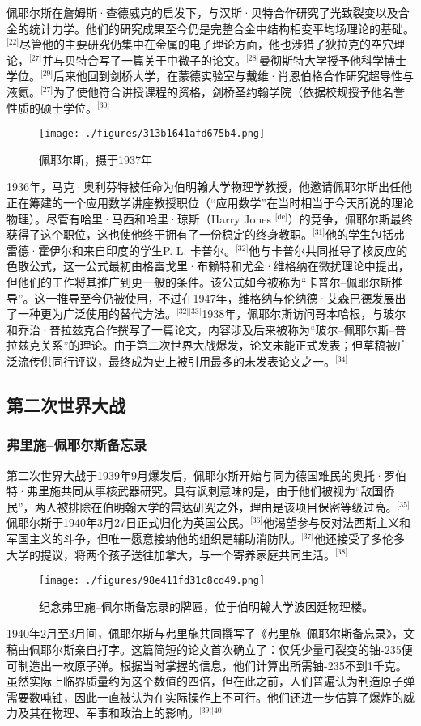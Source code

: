 佩耶尔斯在詹姆斯·查德威克的启发下，与汉斯·贝特合作研究了光致裂变以及合金的统计力学。他们的研究成果至今仍是完整合金中结构相变平均场理论的基础。\(^\text{[22]}\)尽管他的主要研究仍集中在金属的电子理论方面，他也涉猎了狄拉克的空穴理论，\(^\text{[27]}\)并与贝特合写了一篇关于中微子的论文。\(^\text{[28]}\)曼彻斯特大学授予他科学博士学位。\(^\text{[29]}\)后来他回到剑桥大学，在蒙德实验室与戴维·肖恩伯格合作研究超导性与液氦。\(^\text{[27]}\)为了使他符合讲授课程的资格，剑桥圣约翰学院（依据校规授予他名誉性质的硕士学位。\(^\text{[30]}\)
\begin{figure}[ht]
\centering
\texttt{[image: ./figures/313b1641afd675b4.png]}
\caption{佩耶尔斯，摄于1937年} \label{fig_LDF_3}
\end{figure}
1936年，马克·奥利芬特被任命为伯明翰大学物理学教授，他邀请佩耶尔斯出任他正在筹建的一个应用数学讲座教授职位（“应用数学”在当时相当于今天所说的理论物理）。尽管有哈里·马西和哈里·琼斯（Harry Jones \(^\text{[de]}\)）的竞争，佩耶尔斯最终获得了这个职位，这也使他终于拥有了一份稳定的终身教职。\(^\text{[31]}\)他的学生包括弗雷德·霍伊尔和来自印度的学生P. L. 卡普尔。\(^\text{[32]}\)他与卡普尔共同推导了核反应的色散公式，这一公式最初由格雷戈里·布赖特和尤金·维格纳在微扰理论中提出，但他们的工作将其推广到更一般的条件。该公式如今被称为“卡普尔–佩耶尔斯推导”。这一推导至今仍被使用，不过在1947年，维格纳与伦纳德·艾森巴德发展出了一种更为广泛使用的替代方法。\(^\text{[32][33]}\)1938年，佩耶尔斯访问哥本哈根，与玻尔和乔治·普拉兹克合作撰写了一篇论文，内容涉及后来被称为“玻尔–佩耶尔斯–普拉兹克关系”的理论。由于第二次世界大战爆发，论文未能正式发表；但草稿被广泛流传供同行评议，最终成为史上被引用最多的未发表论文之一。\(^\text{[34]}\)
\subsection{第二次世界大战}
\subsubsection{弗里施–佩耶尔斯备忘录}
第二次世界大战于1939年9月爆发后，佩耶尔斯开始与同为德国难民的奥托·罗伯特·弗里施共同从事核武器研究。具有讽刺意味的是，由于他们被视为“敌国侨民”，两人被排除在伯明翰大学的雷达研究之外，理由是该项目保密等级过高。\(^\text{[35]}\)佩耶尔斯于1940年3月27日正式归化为英国公民。\(^\text{[36]}\)他渴望参与反对法西斯主义和军国主义的斗争，但唯一愿意接纳他的组织是辅助消防队。\(^\text{[37]}\)他还接受了多伦多大学的提议，将两个孩子送往加拿大，与一个寄养家庭共同生活。\(^\text{[38]}\)
\begin{figure}[ht]
\centering
\texttt{[image: ./figures/98e411fd31c8cd49.png]}
\caption{纪念弗里施–佩尔斯备忘录的牌匾，位于伯明翰大学波因廷物理楼。} \label{fig_LDF_4}
\end{figure}
1940年2月至3月间，佩耶尔斯与弗里施共同撰写了《弗里施–佩耶尔斯备忘录》，文稿由佩耶尔斯亲自打字。这篇简短的论文首次确立了：仅凭少量可裂变的铀-235便可制造出一枚原子弹。根据当时掌握的信息，他们计算出所需铀-235不到1千克。虽然实际上临界质量约为这个数值的四倍，但在此之前，人们普遍认为制造原子弹需要数吨铀，因此一直被认为在实际操作上不可行。他们还进一步估算了爆炸的威力及其在物理、军事和政治上的影响。\(^\text{[39][40]}\)

